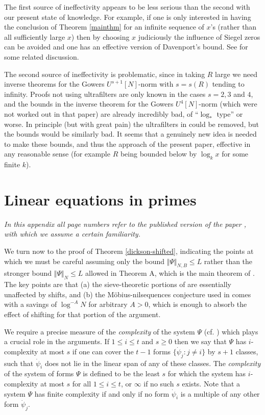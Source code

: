 \documentclass[11pt]{amsart}
\numberwithin{equation}{section}  %
\theoremstyle{remark}
\theoremstyle{plain}
\numberwithin{equation}{section}
\renewcommand{\leq}{\leqslant}
\renewcommand{\geq}{\geqslant}
\renewcommand{\(}{\left(}
\renewcommand{\)}{\right)}
\begin{document}
The first source of ineffectivity appears to be less serious than the second with our present state of knowledge. For example, if one is only interested in having the conclusion of Theorem \ref{mainthm} for an infinite sequence of $x$'s (rather than all sufficiently large $x$) then by choosing $x$ judiciously the influence of Siegel zeros can be avoided and one has an effective version of Davenport's bound.  See \cite{Da} for some related discussion.

The second source of ineffectivity is problematic, since in taking $R$ large we need inverse theorems for the Gowers $U^{s+1}[N]$-norm with $s = s(R)$ tending to infinity. Proofs not using ultrafilters are only known in the cases $s = 2,3$ and $4$, and the bounds in the inverse theorem \cite{GTZ-4} for the Gowers $U^{4}[N]$-norm (which were not worked out in that paper) are already incredibly bad, of ``$\log_*$ type'' or worse. In principle (but with great pain) the ultrafilters in \cite{GTZ} could be removed, but the bounds would be similarly bad. It seems that a genuinely new idea is needed to make these bounds, and thus the approach of the present paper, effective in any reasonable sense (for example $R$ being bounded below by $\log_k x$ for some finite $k$).


\appendix

\section{Linear equations in primes}\label{linear-primes-app}

\emph{In this appendix all page numbers refer to the published version of the paper \cite{gt-linearprimes}, with which we assume a certain familiarity.}

We turn now to the proof of Theorem \ref{dickson-shifted}, indicating the points at which we must be careful assuming only the bound $\Vert \Psi \Vert_{N, B} \leq L$ rather than the stronger bound $\Vert \Psi \Vert_{N} \leq L$ allowed in Theorem A, which is the main theorem of \cite{gt-linearprimes}.  The key points are that (a) the sieve-theoretic portions of \cite{gt-linearprimes} are essentially unaffected by shifts, and (b) the M\"obius-nilsequences conjecture used in \cite{gt-linearprimes} comes with a savings of $\log^{-A} N$ for arbitrary $A > 0$, which is enough to absorb the effect of shifting for that portion of the argument.

We require a precise measure of the \emph{complexity} of the system
 $\Psi$ (cf. \cite[Definition 1.5]{gt-linearprimes}) which plays a crucial role in the arguments.  If $1 \leq i \leq t$ and $s \geq 0$ then we say that $\Psi$ has $i$-complexity at most $s$ if one can cover the $t-1$ forms $\{\dot\psi_j : j \ne i \}$ by $s + 1$ classes, such that $\dot\psi_i$ does not lie in the linear span of any of these classes. The \emph{complexity} of the system of forms $\Psi$ is defined to be the least $s$ for which the system has $i$-complexity at most $s$ for all $1 \leq i \leq t$, or $\infty$ if no such $s$ exists.  Note that a system $\Psi$ has finite complexity if and only if no form $\dot\psi_i$ is a multiple of any other form $\dot\psi_j$. 
\end{document}
